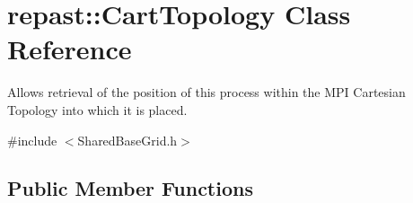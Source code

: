 \hypertarget{classrepast_1_1_cart_topology}{\section{repast\-:\-:Cart\-Topology Class Reference}
\label{classrepast_1_1_cart_topology}
}


Allows retrieval of the position of this process within the M\-P\-I Cartesian Topology into which it is placed.  




{\ttfamily \#include $<$Shared\-Base\-Grid.\-h$>$}

\subsection*{Public Member Functions}
